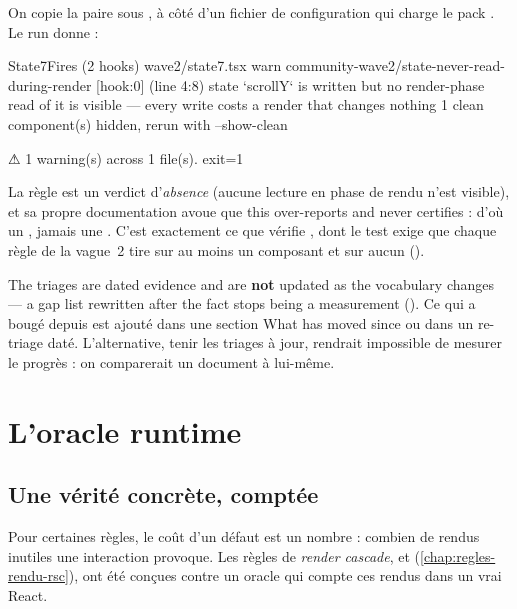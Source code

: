 On copie la paire sous , à côté d'un fichier de configuration  qui charge le pack . Le run donne :

\begin{sortie}
  State7Fires  (2 hooks)  wave2/state7.tsx
    warn   community-wave2/state-never-read-during-render  [hook:0]  (line 4:8)  state `scrollY` is written but no render-phase read of it is visible — every write costs a render that changes nothing
   1 clean component(s) hidden, rerun with --show-clean

⚠  1 warning(s) across 1 file(s).
exit=1
\end{sortie}

La règle est un verdict d'\emph{absence} (aucune lecture en phase de rendu n'est visible), et sa propre documentation avoue que \og this over-reports and never certifies\fg{} : d'où un \Warning{}, jamais une \Error{}. C'est exactement ce que vérifie , dont le test  exige que chaque règle de la vague~2 tire sur au moins un composant  et sur aucun  ().

\begin{decision}
\og The triages are dated evidence and are \textbf{not} updated as the vocabulary changes — a gap list rewritten after the fact stops being a measurement\fg{} (). Ce qui a bougé depuis est ajouté dans une section \og What has moved since\fg{} ou dans un re-triage daté. L'alternative, tenir les triages à jour, rendrait impossible de mesurer le progrès : on comparerait un document à lui-même.
\end{decision}

\section{L'oracle runtime}
\label{sec:tests-corpus-oracle}

\subsection{Une vérité concrète, comptée}

Pour certaines règles, le coût d'un défaut est un nombre : combien de rendus inutiles une interaction provoque. Les règles de \emph{render cascade},  et  (\cref{chap:regles-rendu-rsc}), ont été conçues contre un oracle qui compte ces rendus dans un vrai React.

